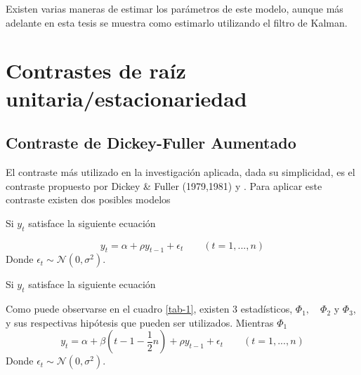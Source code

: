 \documentclass[12pt, twoside]{book}\usepackage[]{graphicx}\usepackage[]{color}
\numberwithin{equation}{section}
\numberwithin{theorem}{section}
\numberwithin{teorema}{section}
\numberwithin{defi}{section}
\numberwithin{prop}{section}
\numberwithin{defi}{section}
\theoremstyle{plain}
\begin{document}
Existen varias maneras de estimar los parámetros de este modelo, aunque más adelante en esta tesis se muestra como estimarlo utilizando el filtro de Kalman.

\section{Contrastes de raíz unitaria/estacionariedad}

\subsection{Contraste de Dickey-Fuller Aumentado}

El contraste más utilizado en la investigación aplicada, dada su simplicidad, es el contraste propuesto por Dickey \& Fuller (1979,1981) y . Para aplicar este contraste existen dos posibles modelos 

Si $y_{t}$ satisface la siguiente ecuación

\begin{equation}
y_{t} = \alpha+\rho y_{t-1}+\epsilon_{t}\qquad (t=1,...,n)
\end{equation}
Donde $\epsilon_{t}\sim \mathcal{N}(0,\sigma^{2})$. 

Si $y_{t}$ satisface la siguiente ecuación 

Como puede observarse en el cuadro \ref{tab-1}, existen 3 estadísticos, $\Phi_{1},\quad \Phi_{2}$ y $\Phi_{3}$, y sus respectivas hipótesis que pueden ser utilizados. Mientras $\Phi_{1}$
\begin{equation}
y_{t} = \alpha+\beta\left(t-1-\frac{1}{2}n\right)+\rho y_{t-1}+\epsilon_{t}\qquad (t=1,...,n)
\end{equation}
Donde $\epsilon_{t}\sim \mathcal{N}(0,\sigma^{2})$. 
\end{document}
